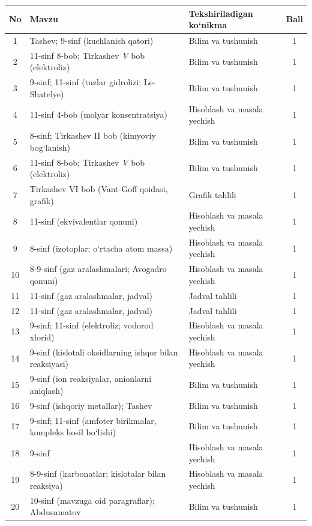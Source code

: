 \documentclass[11pt,a4paper]{article}
\begin{document}
{\small\noindent\begin{longtable}{|c|p{7.2cm}|p{5.4cm}|c|}\hline \textbf{No} & \textbf{Mavzu} & \textbf{Tekshiriladigan ko`nikma} & \textbf{Ball}\\\hline
1 & Tashev; 9-sinf (kuchlanish qatori) & Bilim va tushunish & 1\\\hline
2 & 11-sinf 8-bob; Tirkashev \textit{V} bob (elektroliz) & Bilim va tushunish & 1\\\hline
3 & 9-sinf; 11-sinf (tuzlar gidrolizi; Le-Shatelye) & Bilim va tushunish & 1\\\hline
4 & 11-sinf 4-bob (molyar konsentratsiya) & Hisoblash va masala yechish & 1\\\hline
5 & 8-sinf; Tirkashev II bob (kimyoviy bog`lanish) & Bilim va tushunish & 1\\\hline
6 & 11-sinf 8-bob; Tirkashev \textit{V} bob (elektroliz) & Bilim va tushunish & 1\\\hline
7 & Tirkashev VI bob (Vant-Goff qoidasi, grafik) & Grafik tahlili & 1\\\hline
8 & 11-sinf (ekvivalentlar qonuni) & Hisoblash va masala yechish & 1\\\hline
9 & 8-sinf (izotoplar; o`rtacha atom massa) & Hisoblash va masala yechish & 1\\\hline
10 & 8-9-sinf (gaz aralashmalari; Avogadro qonuni) & Hisoblash va masala yechish & 1\\\hline
11 & 11-sinf (gaz aralashmalar, jadval) & Jadval tahlili & 1\\\hline
12 & 11-sinf (gaz aralashmalar, jadval) & Jadval tahlili & 1\\\hline
13 & 9-sinf; 11-sinf (elektroliz; vodorod xlorid) & Hisoblash va masala yechish & 1\\\hline
14 & 9-sinf (kislotali oksidlarning ishqor bilan reaksiyasi) & Hisoblash va masala yechish & 1\\\hline
15 & 9-sinf (ion reaksiyalar, anionlarni aniqlash) & Bilim va tushunish & 1\\\hline
16 & 9-sinf (ishqoriy metallar); Tashev & Bilim va tushunish & 1\\\hline
17 & 9-sinf; 11-sinf (amfoter birikmalar, kompleks hosil bo`lishi) & Bilim va tushunish & 1\\\hline
18 & 9-sinf & Hisoblash va masala yechish & 1\\\hline
19 & 8-9-sinf (karbonatlar; kislotalar bilan reaksiya) & Hisoblash va masala yechish & 1\\\hline
20 & 10-sinf (mavzuga oid paragraflar); Abdusamatov & Bilim va tushunish & 1\\\hline

\end{longtable}}
\end{document}

